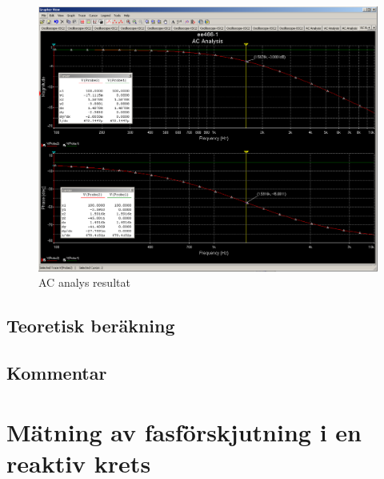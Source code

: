 \documentclass[11pt,a4paper]{article}
\begin{document}
\begin{figure}[htbp]
    \centering
    \includegraphics[scale=0.4]{ee466multisim/5-ACanalysis.png}
    \caption{AC analys resultat}
    \label{fig:sim-5-ACanalysis-results}
\end{figure}


\subsection{Teoretisk beräkning}\label{}

\subsection{Kommentar}\label{}

\clearpage

\section{Mätning av fasförskjutning i en reaktiv krets}\label{}
\end{document}
